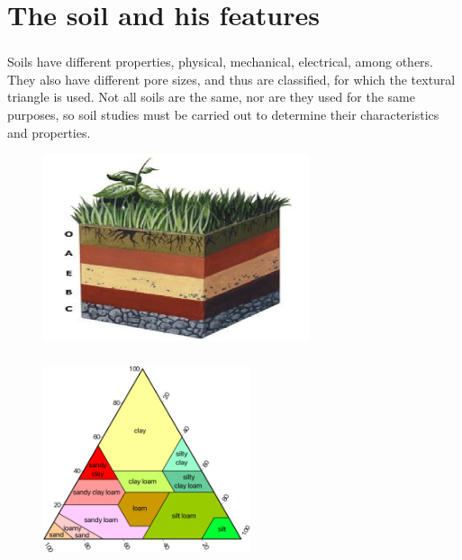 \section{The soil and his features}
\begin{frame}
	\frametitle{\secname}
	Soils have different properties, physical, mechanical, electrical, 
	among others. They also have different pore sizes, and thus are 
	classified, for which the textural triangle is used.
	Not all soils are the same, nor are they used for the same purposes, 
	so soil studies must be carried out to determine their characteristics 
	and properties.
	\begin{figure}[ht!]
		\centering
		\includegraphics[height=5.5cm]{propiedades-suelo}
	\end{figure}
\end{frame}
\begin{frame}
	\frametitle{\secname}
	\begin{minipage}{0.47\textwidth}
		\begin{figure}[ht!]
			\centering
			\includegraphics[height=5.5cm]{textural_soil}
		\end{figure}
	\end{minipage}
	\begin{minipage}{0.5\textwidth}
		
	\end{minipage}
\end{frame}
